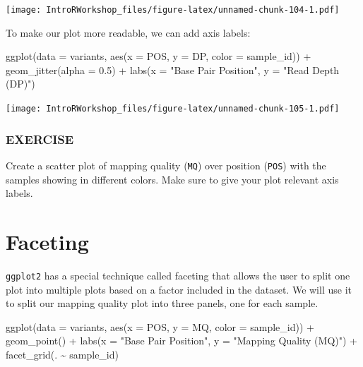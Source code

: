 \documentclass[
]{book}
\newenvironment{Shaded}{\begin{snugshade}}{\end{snugshade}}
\newcommand{\AttributeTok}[1]{\textcolor[rgb]{0.77,0.63,0.00}{#1}}
\newcommand{\FloatTok}[1]{\textcolor[rgb]{0.00,0.00,0.81}{#1}}
\newcommand{\FunctionTok}[1]{\textcolor[rgb]{0.00,0.00,0.00}{#1}}
\newcommand{\NormalTok}[1]{#1}
\newcommand{\SpecialCharTok}[1]{\textcolor[rgb]{0.00,0.00,0.00}{#1}}
\newcommand{\StringTok}[1]{\textcolor[rgb]{0.31,0.60,0.02}{#1}}
\begin{document}
\texttt{[image: IntroRWorkshop\_files/figure-latex/unnamed-chunk-104-1.pdf]}

To make our plot more readable, we can add axis labels:

\begin{Shaded}
\begin{Highlighting}[]
\FunctionTok{ggplot}\NormalTok{(}\AttributeTok{data =}\NormalTok{ variants, }\FunctionTok{aes}\NormalTok{(}\AttributeTok{x =}\NormalTok{ POS, }\AttributeTok{y =}\NormalTok{ DP, }\AttributeTok{color =}\NormalTok{ sample\_id)) }\SpecialCharTok{+}
  \FunctionTok{geom\_jitter}\NormalTok{(}\AttributeTok{alpha =} \FloatTok{0.5}\NormalTok{) }\SpecialCharTok{+}
  \FunctionTok{labs}\NormalTok{(}\AttributeTok{x =} \StringTok{"Base Pair Position"}\NormalTok{,}
       \AttributeTok{y =} \StringTok{"Read Depth (DP)"}\NormalTok{)}
\end{Highlighting}
\end{Shaded}

\texttt{[image: IntroRWorkshop\_files/figure-latex/unnamed-chunk-105-1.pdf]}

\hypertarget{exercise-3}{%
\subsubsection*{EXERCISE}\label{exercise-3}}

Create a scatter plot of mapping quality (\texttt{MQ}) over position (\texttt{POS}) with the samples showing in different colors. Make sure to give your plot relevant axis labels.

\hypertarget{faceting}{%
\section{Faceting}\label{faceting}}

\texttt{ggplot2} has a special technique called faceting that allows the user to split one plot into multiple plots based on a factor included in the dataset. We will use it to split our mapping quality plot into three panels, one for each sample.

\begin{Shaded}
\begin{Highlighting}[]
\FunctionTok{ggplot}\NormalTok{(}\AttributeTok{data =}\NormalTok{ variants, }\FunctionTok{aes}\NormalTok{(}\AttributeTok{x =}\NormalTok{ POS, }\AttributeTok{y =}\NormalTok{ MQ, }\AttributeTok{color =}\NormalTok{ sample\_id)) }\SpecialCharTok{+}
 \FunctionTok{geom\_point}\NormalTok{() }\SpecialCharTok{+}
 \FunctionTok{labs}\NormalTok{(}\AttributeTok{x =} \StringTok{"Base Pair Position"}\NormalTok{,}
      \AttributeTok{y =} \StringTok{"Mapping Quality (MQ)"}\NormalTok{) }\SpecialCharTok{+}
 \FunctionTok{facet\_grid}\NormalTok{(. }\SpecialCharTok{\textasciitilde{}}\NormalTok{ sample\_id)}
\end{Highlighting}
\end{Shaded}
\end{document}
